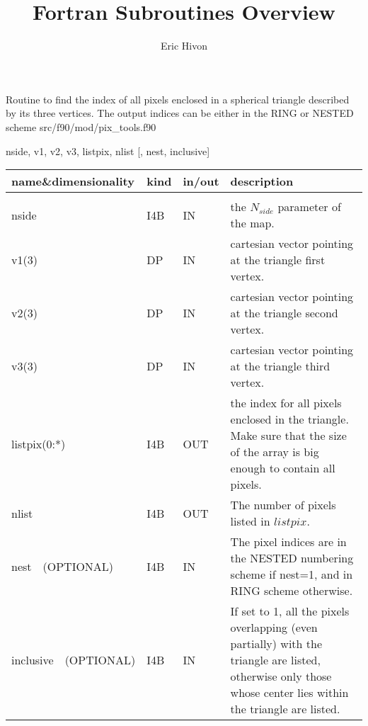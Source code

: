 
\sloppy


\title{\healpix Fortran Subroutines Overview}
 \section[query\_triangle]{ }
\label{sub:query_triangle}
\author{Eric Hivon}

\begin{facility}
{Routine to find the index of all pixels enclosed in a spherical triangle described by its three vertices. The output indices can be either in the RING or NESTED scheme} 
{src/f90/mod/pix\_tools.f90}
\end{facility}

\begin{f90format}
{nside, v1, v2, v3, listpix, nlist [, nest, inclusive]}
\end{f90format}

\begin{arguments}
{
\begin{tabular}{p{0.28\hsize} p{0.05\hsize} p{0.1\hsize} p{0.47\hsize}} \hline 
\textbf{name\&dimensionality} & \textbf{kind} & \textbf{in/out} & \textbf{description} \\ \hline
                   &   &   &                           \\ %
nside & I4B & IN & the $N_{side}$ parameter of the map. \\
v1(3) & DP & IN & cartesian vector pointing at the triangle first vertex. \\
v2(3) & DP & IN & cartesian vector pointing at the triangle second vertex. \\
v3(3) & DP & IN & cartesian vector pointing at the triangle third vertex. \\
listpix(0:*) & I4B & OUT & the index for all pixels enclosed in the triangle. Make sure that the size of the array is big enough to contain all pixels. \\ 
nlist & I4B & OUT & The number of pixels listed in $listpix$. \\
nest\ \ (OPTIONAL) & I4B & IN &  The pixel indices are in the NESTED numbering scheme if nest=1, and in RING scheme otherwise. \\
inclusive\ \ (OPTIONAL) & I4B & IN & If set to 1, all the pixels overlapping
                   (even partially)
                   with the triangle are listed, otherwise only those whose
                   center lies within the triangle are listed. \\
\end{tabular}
}
\end{arguments}

